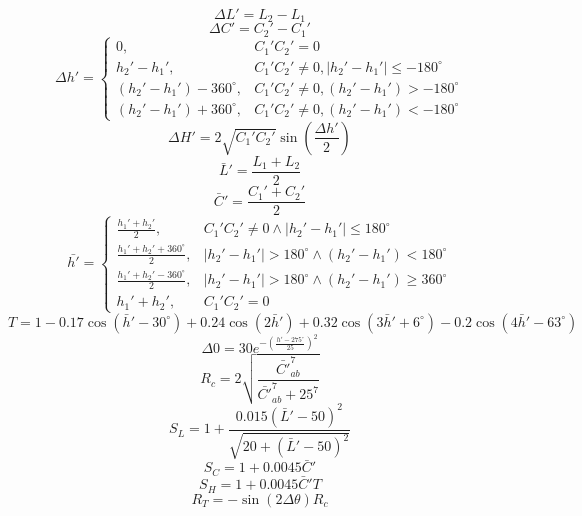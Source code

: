 \begin{appendices}
\begin{equation}
\end{equation}
\begin{equation}
\Delta L'=L_{2}-L_{1}
\end{equation}
\begin{equation}
\Delta C'=C_{2}'-C_{1}'
\end{equation}
\begin{equation}
\Delta h' =
\begin{cases}
0, & C_{1}'C_{2}'=0\\
h_{2}'-h_{1}', & C_{1}'C_{2}'\ne 0, |h_{2}'-h_{1}'| \leq -180^{\circ}\\
(h_{2}'-h_{1}')-360^{\circ}, & C_{1}'C_{2}'\neq 0, (h_{2}'-h_{1}') > -180^{\circ}\\
(h_{2}'-h_{1}')+360^{\circ}, & C_{1}'C_{2}'\neq 0, (h_{2}'-h_{1}') < -180^{\circ}
\end{cases}
\end{equation}
\begin{equation}
\Delta H'=2\sqrt{C_{1}'C_{2}' } \sin\left(\frac{\Delta h'}{2}\right)
\end{equation}
\begin{equation}
\bar{L}'=\frac{L_{1}+L_{2}}{2}
\end{equation}
\begin{equation}
\bar{C}'=\frac{C_{1}'+C_{2}'}{2}
\end{equation}
\begin{equation}
\bar{h'} =
\begin{cases}
\frac{h_{1}'+h_{2}'}{2}, & C_{1}'C_{2}'\neq 0 \wedge |h_{2}'-h_{1}'| \leq 180^{\circ}\\
\frac{h_{1}'+h_{2}'+360^{\circ}}{2}, & |h_{2}'-h_{1}'| > 180^{\circ} \wedge (h_{2}'-h_{1}') < 180^{\circ}\\
\frac{h_{1}'+h_{2}'-360^{\circ}}{2}, & |h_{2}'-h_{1}'| > 180^{\circ} \wedge (h_{2}'-h_{1}') \geq 360^{\circ}\\
h_{1}'+h_{2}', & C_{1}'C_{2}'=0
\end{cases}
\end{equation}
\begin{equation}
T=1-0.17 \cos(\bar{h}'-30^{\circ})+0.24 \cos(2\bar{h}')+0.32\cos(3\bar{h}'+6^{\circ})-0.2 \cos(4\bar{h}'-63^{\circ})
\end{equation}
\begin{equation}
\Delta 0 = 30e^{-(\frac{h'-275^{\circ}}{25})^{2}}
\end{equation} 
\begin{equation}
R_{c}=2\sqrt{\frac{\bar{C'}_{ab}^{7}}{\bar{C'}_{ab}^{7}+25^{7}}}
\end{equation}
\begin{equation}
S_{L}=1+\frac{0.015(\bar{L}'-50)^{2}}{\sqrt{20+(\bar{L}'-50)^{2}}}
\end{equation}
\begin{equation}
S_{C}=1+0.0045\bar{C}'
\end{equation}
\begin{equation}
S_{H}=1+0.0045\bar{C}'T
\end{equation}
\begin{equation}
R_{T}=-\sin(2 \Delta \theta)R_{c}
\end{equation}

\end{appendices}